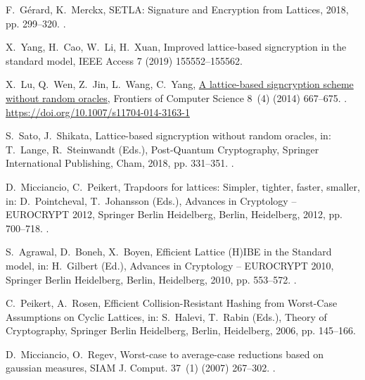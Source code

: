 \documentclass[a4paper,11pt,onecolumn]{elsarticle}
\begin{document}
\begin{thebibliography}{10}
F.~Gérard, K.~Merckx, {SETLA: Signature and Encryption from Lattices}, 2018,
  pp. 299--320.
\newblock \href {http://dx.doi.org/10.1007/978-3-030-00434-7_15}
  {}.

X.~{Yang}, H.~{Cao}, W.~{Li}, H.~{Xuan}, Improved lattice-based signcryption in
  the standard model, IEEE Access 7 (2019) 155552--155562.

X.~Lu, Q.~Wen, Z.~Jin, L.~Wang, C.~Yang,
  \href{https://doi.org/10.1007/s11704-014-3163-1}{A lattice-based signcryption
  scheme without random oracles}, Frontiers of Computer Science 8~(4) (2014)
  667--675.
\newblock \href {http://dx.doi.org/10.1007/s11704-014-3163-1}
  {}.
\newline\urlprefix\url{https://doi.org/10.1007/s11704-014-3163-1}

S.~Sato, J.~Shikata, Lattice-based signcryption without random oracles, in:
  T.~Lange, R.~Steinwandt (Eds.), Post-Quantum Cryptography, Springer
  International Publishing, Cham, 2018, pp. 331--351.
\newblock \href {http://dx.doi.org/10.1007/978-3-319-79063-3_16}
  {}.

D.~Micciancio, C.~Peikert, Trapdoors for lattices: Simpler, tighter, faster,
  smaller, in: D.~Pointcheval, T.~Johansson (Eds.), Advances in Cryptology --
  EUROCRYPT 2012, Springer Berlin Heidelberg, Berlin, Heidelberg, 2012, pp.
  700--718.
\newblock \href {http://dx.doi.org/10.1007/978-3-642-29011-4_41}
  {}.

S.~Agrawal, D.~Boneh, X.~Boyen, {E}fficient {L}attice {(H)IBE} in the
  {S}tandard model, in: H.~Gilbert (Ed.), Advances in Cryptology -- EUROCRYPT
  2010, Springer Berlin Heidelberg, Berlin, Heidelberg, 2010, pp. 553--572.
\newblock \href {http://dx.doi.org/10.1007/978-3-642-13190-5_28}
  {}.

C.~Peikert, A.~Rosen, {Efficient Collision-Resistant Hashing from Worst-Case
  Assumptions on Cyclic Lattices}, in: S.~Halevi, T.~Rabin (Eds.), Theory of
  Cryptography, Springer Berlin Heidelberg, Berlin, Heidelberg, 2006, pp.
  145--166.

D.~Micciancio, O.~Regev, Worst-case to average-case reductions based on
  gaussian measures, SIAM J. Comput. 37~(1) (2007) 267--302.
\newblock \href {http://dx.doi.org/10.1137/S0097539705447360}
  {}.


\end{thebibliography}
\end{document}
